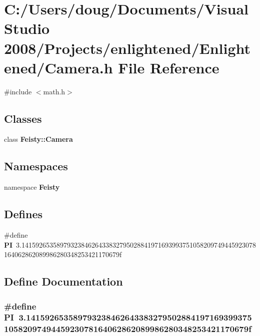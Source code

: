 \section{C:/Users/doug/Documents/Visual Studio 2008/Projects/enlightened/Enlightened/Camera.h File Reference}
\label{_camera_8h}
{\ttfamily \#include $<$math.h$>$}\par
\subsection*{Classes}
\begin{DoxyCompactItemize}
\item 
class {\bf Feisty::Camera}
\end{DoxyCompactItemize}
\subsection*{Namespaces}
\begin{DoxyCompactItemize}
\item 
namespace {\bf Feisty}
\end{DoxyCompactItemize}
\subsection*{Defines}
\begin{DoxyCompactItemize}
\item 
\#define {\bf PI}~3.1415926535897932384626433832795028841971693993751058209749445923078164062862089986280348253421170679f
\end{DoxyCompactItemize}


\subsection{Define Documentation}
\subsubsection[{PI}]{\setlength{\rightskip}{0pt plus 5cm}\#define PI~3.1415926535897932384626433832795028841971693993751058209749445923078164062862089986280348253421170679f}\label{_camera_8h_a598a3330b3c21701223ee0ca14316eca}
